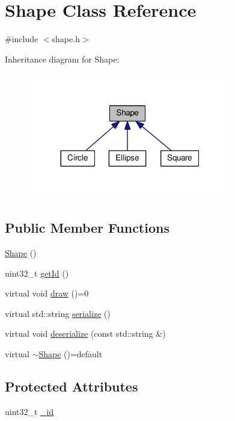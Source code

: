 \hypertarget{class_shape}{\section{Shape Class Reference}
\label{class_shape}
}


{\ttfamily \#include $<$shape.\-h$>$}



Inheritance diagram for Shape\-:
\nopagebreak
\begin{figure}[H]
\begin{center}
\leavevmode
\includegraphics[width=251pt]{class_shape__inherit__graph}
\end{center}
\end{figure}
\subsection*{Public Member Functions}
\begin{DoxyCompactItemize}
\item 
\hyperlink{class_shape_aaa8d87171e65e0d8ba3c5459978992a7}{Shape} ()
\item 
uint32\-\_\-t \hyperlink{class_shape_a485401efc7beb1725c272264374f8822}{get\-Id} ()
\item 
virtual void \hyperlink{class_shape_afacc5aad8e37308c3ce8fef768199b05}{draw} ()=0
\item 
virtual std\-::string \hyperlink{class_shape_acf559a2d89e7560fbfb40a01b21f81b5}{serialize} ()
\item 
virtual void \hyperlink{class_shape_a96e9c57c68f2947ec6093c942e7f7681}{deserialize} (const std\-::string \&)
\item 
virtual \hyperlink{class_shape_ac8ad2fd02e1e94beeb98e65ab795cd56}{$\sim$\-Shape} ()=default
\end{DoxyCompactItemize}
\subsection*{Protected Attributes}
\begin{DoxyCompactItemize}
\item 
uint32\-\_\-t \hyperlink{class_shape_a5de5f48a04ef525d02a7d27b81a47c70}{\-\_\-id}
\end{DoxyCompactItemize}
